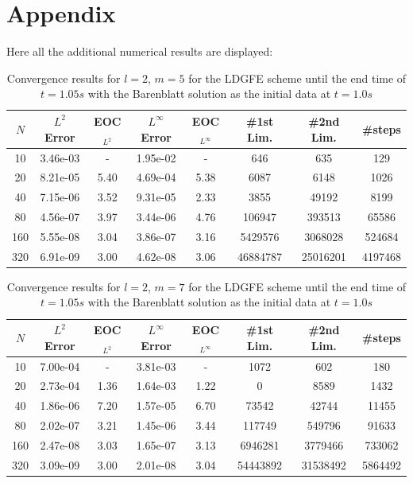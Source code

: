 \documentclass[a4paper,12pt]{paper}
\begin{document}
	\newpage
	
	
	\clearpage
\section{Appendix}
Here all the additional numerical results are displayed:
\begin{table}[h]
	\centering
	\begin{tabular}{cccccccc}
		\hline
		$N$ & $L^2$ Error & EOC$_{L^2}$ & $L^\infty$ Error & EOC$_{L^\infty}$ & \#1st Lim. & \#2nd Lim.& \#steps\\
		\hline
		10 & 3.46e-03 & - & 1.95e-02 & - & 646 & 635 & 129\\
		20 & 8.21e-05 & 5.40 & 4.69e-04 & 5.38 & 6087 & 6148 & 1026\\
		40 & 7.15e-06 & 3.52 & 9.31e-05 & 2.33 & 3855 & 49192 & 8199\\
		80 & 4.56e-07 & 3.97 & 3.44e-06 & 4.76 & 106947 & 393513 & 65586\\
		160 & 5.55e-08 & 3.04 & 3.86e-07 & 3.16 & 5429576 & 3068028 & 524684\\
		320 & 6.91e-09 & 3.00 & 4.62e-08 & 3.06 & 46884787 & 25016201 & 4197468\\
		\hline
	\end{tabular}
	\caption{Convergence results for $l=2$, $m=5$ for the LDGFE scheme until the end time of $t=1.05s$ with the Barenblatt solution as the initial data at $t=1.0s$}
	\label{table:BBM5P2e-2}
\end{table}
\begin{table}[h]
	\centering
	\begin{tabular}{cccccccc}
		\hline
		$N$ & $L^2$ Error & EOC$_{L^2}$ & $L^\infty$ Error & EOC$_{L^\infty}$ & \#1st Lim. & \#2nd Lim.& \#steps\\
		\hline
		10 & 7.00e-04 & - & 3.81e-03 & - & 1072 & 602 & 180\\
		20 & 2.73e-04 & 1.36 & 1.64e-03 & 1.22 & 0 & 8589 & 1432\\
		40 & 1.86e-06 & 7.20 & 1.57e-05 & 6.70 & 73542 & 42744 & 11455\\
		80 & 2.02e-07 & 3.21 & 1.45e-06 & 3.44 & 117749 & 549796 & 91633\\
		160 & 2.47e-08 & 3.03 & 1.65e-07 & 3.13 & 6946281 & 3779466 & 733062\\
		320 & 3.09e-09 & 3.00 & 2.01e-08 & 3.04 & 54443892 & 31538492 & 5864492\\
		\hline
	\end{tabular}
	\caption{Convergence results for $l=2$, $m=7$ for the LDGFE scheme until the end time of $t=1.05s$ with the Barenblatt solution as the initial data at $t=1.0s$}
	\label{table:BBM7P25e-2}
\end{table}
\end{document}
